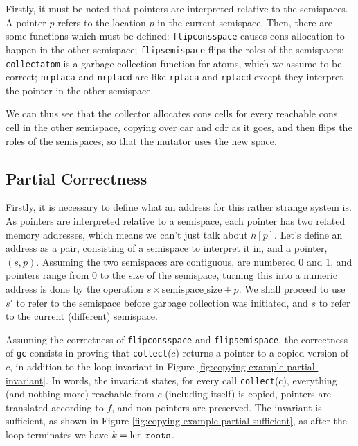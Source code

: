 Firstly, it must be noted that pointers are interpreted relative to
the semispaces. A pointer $p$ refers to the location $p$ in the
current semispace. Then, there are some functions which must be
defined: \texttt{flipconsspace} causes cons allocation to happen in
the other semispace; \texttt{flipsemispace} flips the roles of the
semispaces; \texttt{collectatom} is a garbage collection function for
atoms, which we assume to be correct; \texttt{nrplaca} and
\texttt{nrplacd} are like \texttt{rplaca} and \texttt{rplacd} except
they interpret the pointer in the other semispace.

We can thus see that the collector allocates cons cells for every
reachable cons cell in the other semispace, copying over car and cdr
as it goes, and then flips the roles of the semispaces, so that the
mutator uses the new space.

\subsection{Partial Correctness}
\label{sec:copying-example-partial}

Firstly, it is necessary to define what an address for this rather
strange system is. As pointers are interpreted relative to a
semispace, each pointer has two related memory addresses, which means
we can't just talk about $h[p]$. Let's define an address as a pair,
consisting of a semispace to interpret it in, and a pointer, $(s,
p)$. Assuming the two semispaces are contiguous, are numbered 0 and 1,
and pointers range from 0 to the size of the semispace, turning this
into a numeric address is done by the operation $s \times
\mathrm{semispace\_size} + p$. We shall proceed to use $s'$ to refer
to the semispace before garbage collection was initiated, and $s$ to
refer to the current (different) semispace.

Assuming the correctness of \texttt{flipconsspace} and
\texttt{flipsemispace}, the correctness of \texttt{gc} consists in
proving that \texttt{collect}($c$) returns a pointer to a copied
version of $c$, in addition to the loop invariant in Figure
\ref{fig:copying-example-partial-invariant}. In words, the invariant
states, for every call \texttt{collect}($c$), everything (and nothing
more) reachable from $c$ (including itself) is copied, pointers are
translated according to $f$, and non-pointers are preserved. The
invariant is sufficient, as shown in Figure
\ref{fig:copying-example-partial-sufficient}, as after the loop
terminates we have $k = \mathrm{len}~ \mathtt{roots}$.

